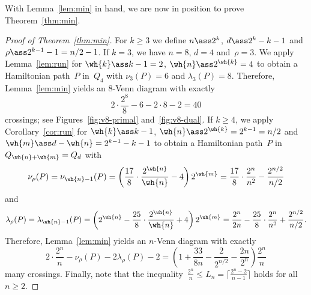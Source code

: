 %
With Lemma~\ref{lem:min} in hand, we are now in position to prove Theorem~\ref{thm:min}.
%
\begin{proof}[Proof of Theorem~\ref{thm:min}]
For $k\ge 3$ we define $n\ass 2^k$, $d\ass 2^k-k-1$ and $\rho\ass 2^{k-1}-1=n/2-1$.
%
If $k=3$, we have $n=8$, $d=4$ and~$\rho=3$.
We apply Lemma~\ref{lem:run} for $\wh{k}\ass k-1=2$, $\wh{n}\ass 2^{\wh{k}}=4$ to obtain a Hamiltonian path~$P$ in~$Q_4$ with $\nu_3(P)=6$ and $\lambda_3(P)=8$.
Therefore, Lemma~\ref{lem:min} yields an $8$-Venn diagram with exactly
\[ 2\cdot\frac{2^8}{8}-6-2\cdot 8-2=40 \]
crossings; see Figures~\ref{fig:v8-primal} and~\ref{fig:v8-dual}.
%
If $k\ge 4$, we apply Corollary~\ref{cor:run} for $\wh{k}\ass k-1$, $\wh{n}\ass 2^{\wh{k}}=2^{k-1}=n/2$ and $\wh{m}\ass d-\wh{n}=2^{k-1}-k-1$ to obtain a Hamiltonian path~$P$ in~$Q_{\wh{n}+\wh{m}}=Q_d$ with
\[ \nu_\rho(P)=\nu_{\wh{n}-1}(P)=\left(\frac{17}{8}\cdot\frac{2^{\wh{n}}}{\wh{n}}-4\right)2^{\wh{m}}=\frac{17}{8}\cdot\frac{2^n}{n^2}-\frac{2^{n/2}}{n/2} \]
and
\[ \lambda_\rho(P)=\lambda_{\wh{n}-1}(P)=\left(2^{\wh{n}}-\frac{25}{8}\cdot \frac{2^{\wh{n}}}{\wh{n}}+4\right)2^{\wh{m}}=\frac{2^n}{2n}-\frac{25}{8}\cdot\frac{2^n}{n^2}+\frac{2^{n/2}}{n/2}. \]
Therefore, Lemma~\ref{lem:min} yields an $n$-Venn diagram with exactly
\[ 2\cdot\frac{2^n}{n}-\nu_\rho(P)-2\lambda_\rho(P)-2=\left(1+\frac{33}{8n}-\frac{2}{2^{n/2}}-\frac{2n}{2^n}\right)\frac{2^n}{n} \]
many crossings.
%
Finally, note that the inequality~$\frac{2^n}{n}\le L_n=\lceil\frac{2^n-2}{n-1}\rceil$ holds for all~$n\ge 2$.
\end{proof}
%
%
